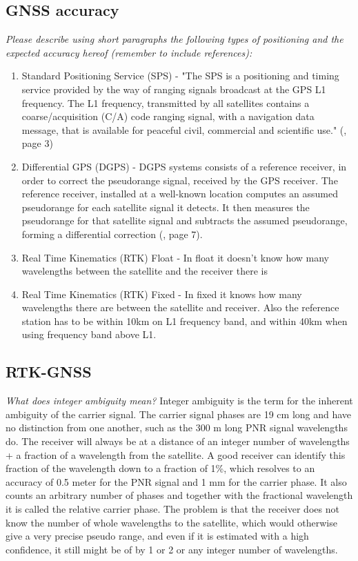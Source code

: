 \documentclass[paper=letter, fontsize=10pt]{article}
\begin{document}
\subsection{GNSS accuracy}
\emph{Please describe using short paragraphs the following types of positioning and the expected accuracy
hereof (remember to include references):}
\begin{enumerate}
\item Standard Positioning Service (SPS) - "The SPS is a positioning and timing service provided by the way of ranging signals broadcast at the GPS L1 frequency. The L1 frequency, transmitted by all satellites contains a coarse/acquisition (C/A) code ranging signal, with a navigation data message, that is available for peaceful civil, commercial and scientific use." (\cite{SPS_Standard}, page 3)
\item Differential GPS (DGPS) - DGPS systems consists of a reference receiver, in order to correct the pseudorange signal, received by the GPS receiver. The reference receiver, installed at a well-known location computes an assumed pseudorange for each satellite signal it detects. It then measures the pseudorange for that satellite signal and subtracts the assumed pseudorange, forming a differential correction (\cite{GNSS_Cobb}, page 7).
\item Real Time Kinematics (RTK) Float - In float it doesn't know how many wavelengths between the satellite and the receiver there is 
\item Real Time Kinematics (RTK) Fixed - In fixed it knows how many wavelengths there are between the satellite and receiver. Also the reference station has to be within 10km on L1 frequency band, and within 40km when using frequency band above L1.
\end{enumerate}

\subsection{RTK-GNSS}
\emph{What does integer ambiguity mean?}
Integer ambiguity is the term for the inherent ambiguity of the carrier signal. The carrier signal phases are 19 cm long and have no distinction from one another, such as the 300 m long PNR signal wavelengths do. The receiver will always be at a distance of an integer number of wavelengths + a fraction of a wavelength from the satellite. A good receiver can identify this fraction of the wavelength down to a fraction of 1\%, which resolves to an accuracy of 0.5 meter for the PNR signal and 1 mm for the carrier phase. It also counts an arbitrary number of phases and together with the fractional wavelength it is called the relative carrier phase. The problem is that the receiver does not know the number of whole wavelengths to the satellite, which would otherwise give a very precise pseudo range, and even if it is estimated with a high confidence, it still might be of by 1 or 2 or any integer number of wavelengths.  
\end{document}
